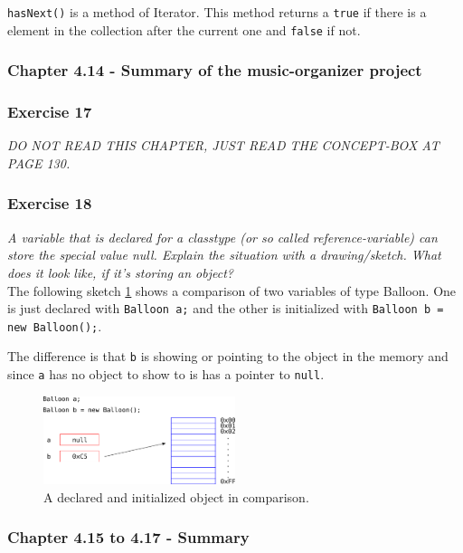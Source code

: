 \lstinline{hasNext()} is a method of Iterator. This method returns a 
\lstinline{true} if there is a element in the collection after the current 
one and \lstinline{false} if not.

\subsubsection{Chapter 4.14 - Summary of the music-organizer project}

\subsubsection*{Exercise 17}
\textit{DO NOT READ THIS CHAPTER, JUST READ THE CONCEPT-BOX AT PAGE 130.}\\

\subsubsection*{Exercise 18}
\textit{A variable that is declared for a classtype (or so called 
reference-variable) can store the special value null. Explain the situation 
with a drawing/sketch. What does it look like, if it's storing an object?}\\

The following sketch \ref{fig:null} shows a comparison of two variables of 
type Balloon.
One is just declared with \lstinline{Balloon a;} and the other is 
initialized with \lstinline{Balloon b = new Balloon();}. 

The difference is that \lstinline{b} is showing or pointing to the object 
in the memory and since \lstinline{a} has no object to show to is has a 
pointer to \lstinline{null}.

\begin{figure}[h!]
	\centering
	\includegraphics[width=0.5\textwidth]{null.pdf}
	\caption{A declared and initialized object in comparison.}
	\label{fig:null}
\end{figure}

\subsubsection{Chapter 4.15 to 4.17 - Summary}

